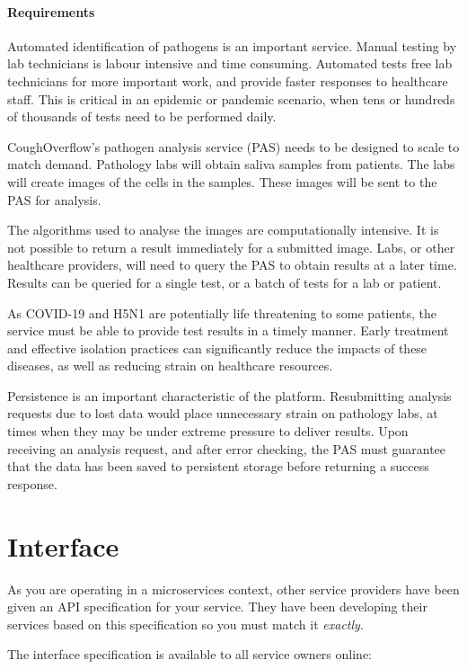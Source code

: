 \documentclass{csse4400}
\begin{document}
\paragraph{Requirements}
Automated identification of pathogens is an important service.
Manual testing by lab technicians is labour intensive and time consuming.
Automated tests free lab technicians for more important work,
and provide faster responses to healthcare staff.
This is critical in an epidemic or pandemic scenario,
when tens or hundreds of thousands of tests need to be performed daily.

CoughOverflow's pathogen analysis service (PAS) needs to be designed to scale to match demand.
Pathology labs will obtain saliva samples from patients.
The labs will create images of the cells in the samples.
These images will be sent to the PAS for analysis.

The algorithms used to analyse the images are computationally intensive.
It is not possible to return a result immediately for a submitted image.
Labs, or other healthcare providers, will need to query the PAS to obtain results at a later time.
Results can be queried for a single test, or a batch of tests for a lab or patient.

As COVID-19 and H5N1 are potentially life threatening to some patients,
the service must be able to provide test results in a timely manner.
Early treatment and effective isolation practices can significantly reduce the impacts of these diseases,
as well as reducing strain on healthcare resources.

Persistence is an important characteristic of the platform.
Resubmitting analysis requests due to lost data would place unnecessary strain on pathology labs,
at times when they may be under extreme pressure to deliver results.
Upon receiving an analysis request, and after error checking,
the PAS must guarantee that the data has been saved to persistent storage before returning a success response.


\section{Interface}
As you are operating in a microservices context,
other service providers have been given an API specification for your service.
They have been developing their services based on this specification so you must match it \emph{exactly}.

The interface specification is available to all service owners online: 
\end{document}

